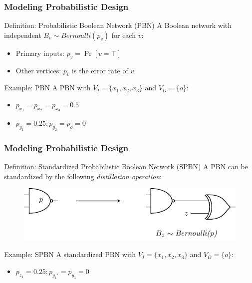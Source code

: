 \begin{frame}
  \frametitle{Modeling Probabilistic Design}
  \begin{block}{Definition: Probabilistic Boolean Network (PBN)}
    A Boolean network with independent $B_v\sim\textit{Bernoulli}(p_v)$ for each $v$:
    \begin{itemize}
      \item Primary inputs: $p_v=\Pr[v=\top]$
      \item Other vertices: $p_v$ is the error rate of $v$
    \end{itemize}
  \end{block}
  \pause
  \begin{block}{Example: PBN}
    A PBN with $V_I=\{x_1,x_2,x_3\}$ and $V_O=\{o\}$:
    \begin{figure}
      \centering
      
    \end{figure}
    \begin{itemize}
      \item $p_{x_1}=p_{x_2}=p_{x_3}=0.5$
      \item $p_{y_1}=0.25;p_{y_2}=p_{o}=0$
    \end{itemize}
  \end{block}
\end{frame}

\begin{frame}
  \frametitle{Modeling Probabilistic Design}
  \begin{block}{Definition: Standardized Probabilistic Boolean Network (SPBN)}
    A PBN can be standardized by the following \textit{distillation operation}:
    \begin{figure}
      \centering
      \includegraphics[scale=0.8]{fig/prob-design-eval/prob-distillation.pdf}
    \end{figure}
  \end{block}
  \pause
  \begin{block}{Example: SPBN}
    A standardized PBN with $V_I=\{x_1,x_2,x_3\}$ and $V_O=\{o\}$:
    \begin{figure}
      \centering
      
    \end{figure}
    \begin{itemize}
      \item $p_{z_1}=0.25;p_{y_1'}=p_{y_3}=0$
    \end{itemize}
  \end{block}
\end{frame}